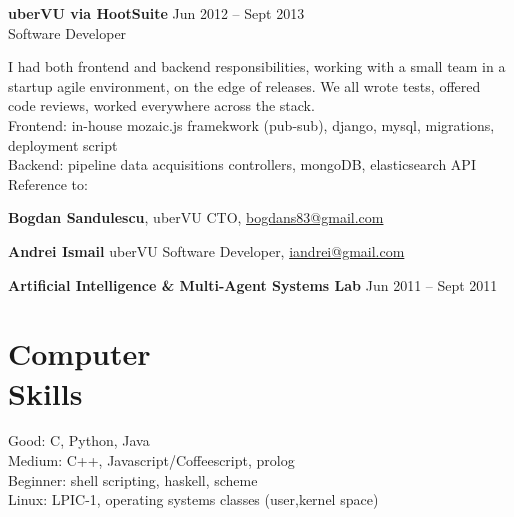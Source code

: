 \documentclass[margin,line]{resume}
\begin{document}
\begin{resume}
    \vspace{1.2mm}\textbf{uberVU via HootSuite}
        \hfill Jun 2012 -- Sept 2013\vspace{1mm}\\
        Software Developer\vspace{1.2mm}\\
    {\fontsize{2.65mm}{1em}\selectfont
      I had both frontend and backend responsibilities, working with a small team in a startup agile environment, on the edge of releases. We all wrote tests, offered code reviews, worked everywhere across the stack.\vspace{1.2mm}\\
      Frontend: in-house mozaic.js framekwork (pub-sub), django, mysql, migrations, deployment script\vspace{1.2mm}\\
      Backend: pipeline data acquisitions controllers, mongoDB, elasticsearch API\vspace{1.2mm}\\
      Reference to:
      \begin{list2}
          \item \textbf{Bogdan Sandulescu}, uberVU CTO, \href{mailto:bogdans83@gmail.com}{bogdans83@gmail.com}
          \item \textbf{Andrei Ismail} uberVU Software Developer, \href{mailto:iandrei@gmail.com}{iandrei@gmail.com}
      \end{list2}
    }

    \vspace{1.2mm}\textbf{Artificial Intelligence \& Multi-Agent Systems Lab}
        \hfill Jun 2011 -- Sept 2011
    \section{\mysidestyle Computer\\Skills}

    Good: C, Python, Java                            \\
    Medium: C++, Javascript/Coffeescript, prolog    \\
    Beginner: shell scripting, haskell, scheme                    \\
    Linux: LPIC-1, operating systems classes (user,kernel space)

   \pagebreak


\end{resume}
\end{document}
